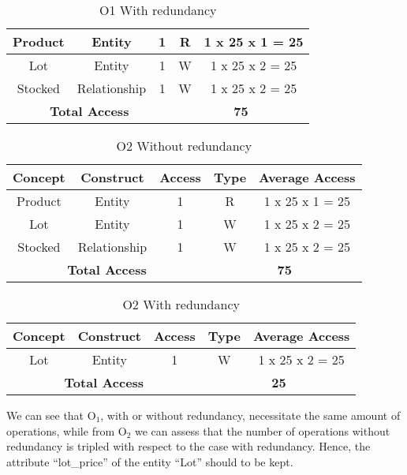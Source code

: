\begin{table}[!h]\caption{O1 With redundancy}
	\begin{center}
		\begin{tabular}{| c | c | c | c | c |}
			\hline
			Product & Entity & 1 & R & 1 x 25 x 1 = 25 \\ \hline
			Lot & Entity & 1 & W & 1 x 25 x 2 = 25 \\ \hline
			Stocked & Relationship & 1 & W & 1 x 25 x 2 = 25 \\ \hline
			\multicolumn{3}{|c|}{\textbf{Total Access}} & \multicolumn{2}{|c|}{\textbf{75}} \\ \hline
		\end{tabular}
	\end{center}
\end{table}
\begin{table}[!h]\caption{O2 Without redundancy}
	\begin{center}
		\begin{tabular}{| c | c | c | c | c |}
			\hline
			\textbf{Concept} & \textbf{Construct} & \textbf{Access} & \textbf{Type} & \textbf{Average Access} \\ \hline
			Product & Entity & 1 & R & 1 x 25 x 1 = 25 \\ \hline
			Lot & Entity & 1 & W & 1 x 25 x 2 = 25 \\ \hline
			Stocked & Relationship & 1 & W & 1 x 25 x 2 = 25 \\ \hline
			\multicolumn{3}{|c|}{\textbf{Total Access}} & \multicolumn{2}{|c|}{\textbf{75}} \\ \hline
		\end{tabular}
	\end{center}
\end{table}
\begin{table}[!h]\caption{O2 With redundancy}
	\begin{center}
		\begin{tabular}{| c | c | c | c | c |}
			\hline
			\textbf{Concept} & \textbf{Construct} & \textbf{Access} & \textbf{Type} & \textbf{Average Access} \\ \hline
			Lot & Entity & 1 & W & 1 x 25 x 2 = 25 \\ \hline
			\multicolumn{3}{|c|}{\textbf{Total Access}} & \multicolumn{2}{|c|}{\textbf{25}} \\ \hline
		\end{tabular}
	\end{center}
\end{table}
We can see that $ \textrm{O}_\textrm{1} $, with or without redundancy, necessitate the same amount of operations, while from $ \textrm{O}_\textrm{2} $ we can assess that the number of operations without redundancy is tripled with respect to the case with redundancy. Hence, the attribute ``lot\_price'' of the entity ``Lot'' should to be kept.
